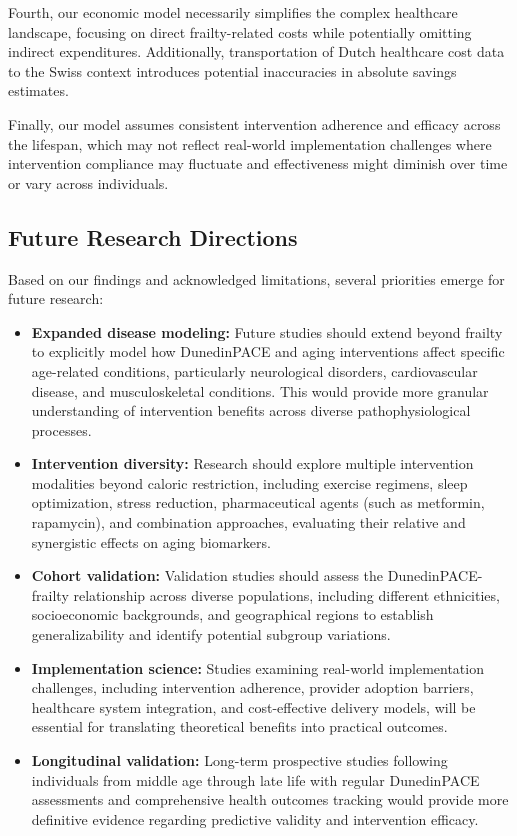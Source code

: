 Fourth, our economic model necessarily simplifies the complex healthcare landscape, focusing on direct frailty-related costs while potentially omitting indirect expenditures. Additionally, transportation of Dutch healthcare cost data to the Swiss context introduces potential inaccuracies in absolute savings estimates.

Finally, our model assumes consistent intervention adherence and efficacy across the lifespan, which may not reflect real-world implementation challenges where intervention compliance may fluctuate and effectiveness might diminish over time or vary across individuals.

\subsection{Future Research Directions}

Based on our findings and acknowledged limitations, several priorities emerge for future research:

\begin{itemize}
    \item \textbf{Expanded disease modeling:} Future studies should extend beyond frailty to explicitly model how DunedinPACE and aging interventions affect specific age-related conditions, particularly neurological disorders, cardiovascular disease, and musculoskeletal conditions. This would provide more granular understanding of intervention benefits across diverse pathophysiological processes.
    
    \item \textbf{Intervention diversity:} Research should explore multiple intervention modalities beyond caloric restriction, including exercise regimens, sleep optimization, stress reduction, pharmaceutical agents (such as metformin, rapamycin), and combination approaches, evaluating their relative and synergistic effects on aging biomarkers.
    
    \item \textbf{Cohort validation:} Validation studies should assess the DunedinPACE-frailty relationship across diverse populations, including different ethnicities, socioeconomic backgrounds, and geographical regions to establish generalizability and identify potential subgroup variations.
    
    \item \textbf{Implementation science:} Studies examining real-world implementation challenges, including intervention adherence, provider adoption barriers, healthcare system integration, and cost-effective delivery models, will be essential for translating theoretical benefits into practical outcomes.
    
    \item \textbf{Longitudinal validation:} Long-term prospective studies following individuals from middle age through late life with regular DunedinPACE assessments and comprehensive health outcomes tracking would provide more definitive evidence regarding predictive validity and intervention efficacy.
\end{itemize}

